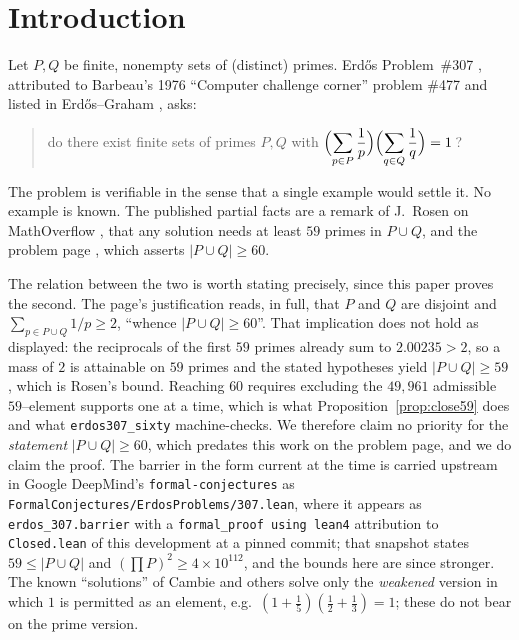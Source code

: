 \documentclass[11pt]{article}
\theoremstyle{definition}
\begin{document}
\section{Introduction}\label{sec:intro}

Let $P,Q$ be finite, nonempty sets of (distinct) primes. Erd\H{o}s Problem~\#307
\cite{ErdosProblems307}, attributed to Barbeau's 1976 ``Computer challenge corner'' problem
\#477 \cite{Barbeau1976} and listed in Erd\H{o}s--Graham \cite{ErdosGraham1980}, asks:
\begin{quote}
do there exist finite sets of primes $P,Q$ with
$\displaystyle\Bigl(\sum_{p\in P}\frac1p\Bigr)\Bigl(\sum_{q\in Q}\frac1q\Bigr)=1$\,?
\end{quote}
The problem is verifiable in the sense that a single example would settle it. No example is known.
The published partial facts are a remark of J.~Rosen on MathOverflow \cite{MO320838}, that any
solution needs at least $59$ primes in $P\cup Q$, and the problem page \cite{ErdosProblems307},
which asserts $|P\cup Q|\ge60$.

The relation between the two is worth stating precisely, since this paper proves the second. The
page's justification reads, in full, that $P$ and $Q$ are disjoint and
$\sum_{p\in P\cup Q}1/p\ge2$, ``whence $|P\cup Q|\ge60$''. That implication does not hold as
displayed: the reciprocals of the first $59$ primes already sum to $2.00235>2$, so a mass of $2$ is
attainable on $59$ primes and the stated hypotheses yield $|P\cup Q|\ge59$, which is Rosen's bound.
Reaching $60$ requires excluding the $49{,}961$ admissible $59$--element supports one at a time,
which is what Proposition~\ref{prop:close59} does and what \texttt{erdos307\_sixty} machine-checks.
We therefore claim no priority for the \emph{statement} $|P\cup Q|\ge60$, which predates this work on
the problem page, and we do claim the proof. The barrier in the form current at the time is carried
upstream in Google DeepMind's \texttt{formal-conjectures} as
\texttt{FormalConjectures/ErdosProblems/307.lean}, where it appears as \texttt{erdos\_307.barrier}
with a \texttt{formal\_proof using lean4} attribution to \texttt{Closed.lean} of this development at
a pinned commit; that snapshot states $59\le|P\cup Q|$ and $(\prod P)^2\ge4\times10^{112}$, and the
bounds here are since stronger. The known
``solutions'' of Cambie and others solve only the \emph{weakened} version in which $1$ is permitted
as an element, e.g.\ $(1+\tfrac15)(\tfrac12+\tfrac13)=1$; these do not bear on the prime version.
\end{document}
